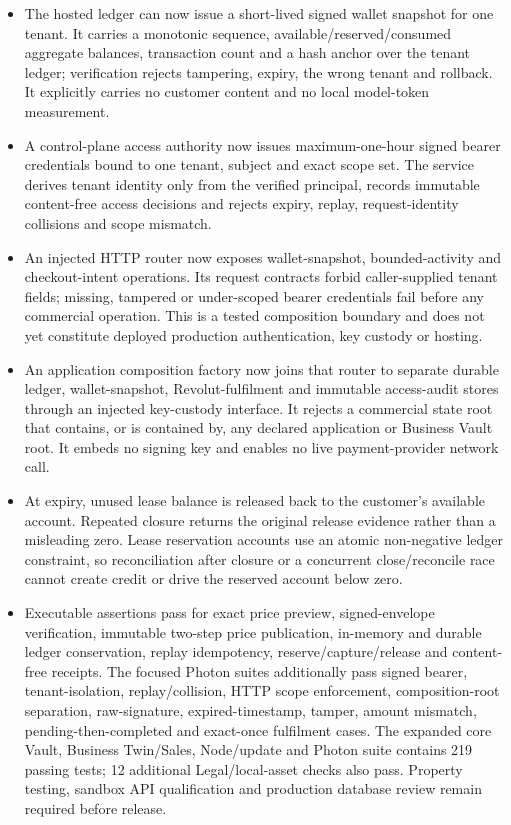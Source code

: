 \documentclass[11pt]{article}
\begin{document}
\begin{itemize}
  \item The hosted ledger can now issue a short-lived signed wallet snapshot for one tenant. It carries a monotonic sequence, available/reserved/consumed aggregate balances, transaction count and a hash anchor over the tenant ledger; verification rejects tampering, expiry, the wrong tenant and rollback. It explicitly carries no customer content and no local model-token measurement.
  \item A control-plane access authority now issues maximum-one-hour signed bearer credentials bound to one tenant, subject and exact scope set. The service derives tenant identity only from the verified principal, records immutable content-free access decisions and rejects expiry, replay, request-identity collisions and scope mismatch.
  \item An injected HTTP router now exposes wallet-snapshot, bounded-activity and checkout-intent operations. Its request contracts forbid caller-supplied tenant fields; missing, tampered or under-scoped bearer credentials fail before any commercial operation. This is a tested composition boundary and does not yet constitute deployed production authentication, key custody or hosting.
  \item An application composition factory now joins that router to separate durable ledger, wallet-snapshot, Revolut-fulfilment and immutable access-audit stores through an injected key-custody interface. It rejects a commercial state root that contains, or is contained by, any declared application or Business Vault root. It embeds no signing key and enables no live payment-provider network call.
  \item At expiry, unused lease balance is released back to the customer's available account. Repeated closure returns the original release evidence rather than a misleading zero. Lease reservation accounts use an atomic non-negative ledger constraint, so reconciliation after closure or a concurrent close/reconcile race cannot create credit or drive the reserved account below zero.
  \item Executable assertions pass for exact price preview, signed-envelope verification, immutable two-step price publication, in-memory and durable ledger conservation, replay idempotency, reserve/capture/release and content-free receipts. The focused Photon suites additionally pass signed bearer, tenant-isolation, replay/collision, HTTP scope enforcement, composition-root separation, raw-signature, expired-timestamp, tamper, amount mismatch, pending-then-completed and exact-once fulfilment cases. The expanded core Vault, Business Twin/Sales, Node/update and Photon suite contains 219 passing tests; 12 additional Legal/local-asset checks also pass. Property testing, sandbox API qualification and production database review remain required before release.
\end{itemize}
\end{document}
